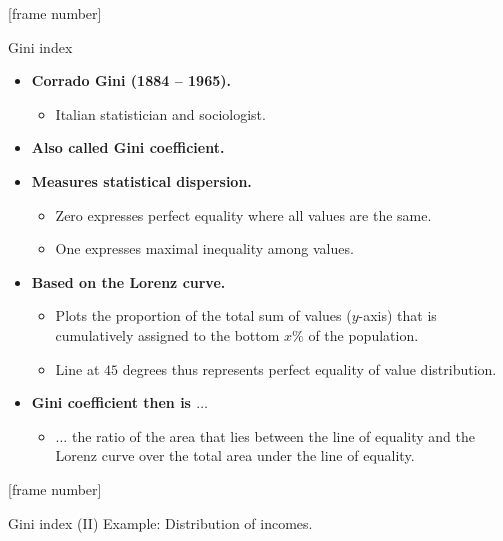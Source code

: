 \documentclass[aspectratio=169,t,table]{beamer}
\begin{document}
  {
    [frame number]
    \begin{frame}{Gini index}
      \begin{itemize}
        \item \textbf{Corrado Gini (1884 -- 1965).}
        \begin{itemize}
          \item Italian statistician and sociologist.
        \end{itemize}
        \item \textbf{Also called Gini coefficient.}
        \item \textbf{Measures statistical dispersion.}
        \begin{itemize}
          \item Zero expresses perfect equality where all values are the same.
          \item One expresses maximal inequality among values.
        \end{itemize}
        \item \textbf{Based on the Lorenz curve.}
        \begin{itemize}
          \item Plots the proportion of the total sum of values ($y$-axis) that is cumulatively assigned to the bottom $x\%$ of the population.
          \item Line at $45$ degrees thus represents perfect equality of value distribution.
        \end{itemize}
        \item \textbf{Gini coefficient then is $\ldots$}
        \begin{itemize}
          \item $\ldots$ the ratio of the area that lies between the line of equality and the Lorenz curve over the total area under the line of equality.
        \end{itemize}
      \end{itemize}
    \end{frame}
  }

  {
    [frame number]
    \begin{frame}{Gini index (II)}
      \centering
      Example: Distribution of incomes.\\[0.5cm]
    \end{frame}
  }
\end{document}
